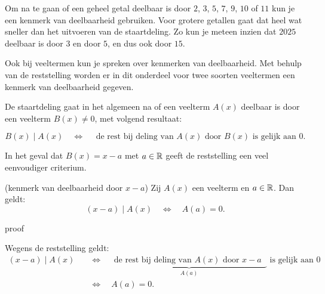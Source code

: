 \documentclass{ximera}
\begin{document}
	\author{Koen de Naeghel - Wiskunde Op Maat}
    \xmsource


Om na te gaan of een geheel getal deelbaar is door $2$, $3$, $5$, $7$, $9$, $10$ of $11$ kun je een kenmerk van deelbaarheid gebruiken. Voor grotere getallen gaat dat heel wat sneller dan het uitvoeren van de staartdeling. Zo kun je meteen inzien dat $2025$ deelbaar is door $3$ en door $5$, en dus ook door $15$.  

Ook bij veeltermen kun je spreken over kenmerken van deelbaarheid. Met behulp van de reststelling worden er in dit onderdeel voor twee soorten veeltermen een kenmerk van deelbaarheid gegeven. 

De staartdeling gaat in het algemeen na of een veelterm $A(x)$ deelbaar is door een veelterm $B(x) \neq 0$, met volgend resultaat:

\[
B(x) \mid A(x) \quad \Leftrightarrow \quad \text{ de rest bij deling van $A(x)$ door $B(x)$ is gelijk aan $0$.}
\] 

In het geval dat $B(x) = x-a$ met $a \in \mathbb{R}$ geeft de reststelling een veel eenvoudiger criterium.

\begin{theorem}(kenmerk van deelbaarheid door \(x-a\))
Zij $A(x)$ een veelterm en $a \in \mathbb{R}$. Dan geldt:
\[
(x-a) \mid A(x) \quad \Leftrightarrow \quad A(a) = 0.
\]
\end{theorem} 


\begin{expandable}{proof}{}

Wegens de reststelling geldt:
\begin{align}
(x-a) \mid A(x) \quad 
& \Leftrightarrow \quad \underbrace{\text{ de rest bij deling van $A(x)$ door $x-a$ }}_{A(a)} \text{ is gelijk aan $0$} \nonumber \\
& \Leftrightarrow \quad A(a) = 0. %
\end{align}

\end{expandable}
\end{document}
